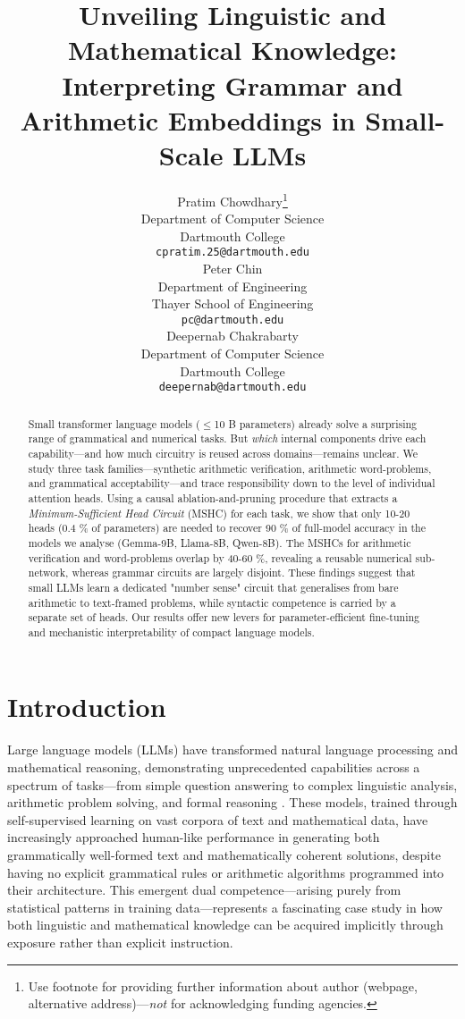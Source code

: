 \documentclass{article}
\title{Unveiling Linguistic and Mathematical Knowledge: Interpreting Grammar and Arithmetic Embeddings in Small-Scale LLMs}
\author{%
  Pratim Chowdhary\thanks{Use footnote for providing further information
    about author (webpage, alternative address)---\emph{not} for acknowledging
    funding agencies.} \\
  Department of Computer Science\\
  Dartmouth College\\
  \texttt{cpratim.25@dartmouth.edu} \\
  \And
  Peter Chin \\
  Department of Engineering\\
  Thayer School of Engineering\\
  \texttt{pc@dartmouth.edu} \\
  \And
  Deepernab Chakrabarty \\
  Department of Computer Science\\
  Dartmouth College\\
  \texttt{deepernab@dartmouth.edu} \\
}
\begin{document}
\maketitle

\begin{abstract}
Small transformer language models ($\leq$10 B parameters) already solve a surprising range of grammatical and numerical tasks. But \emph{which} internal components drive each capability—and how much circuitry is reused across domains—remains unclear. We study three task families—synthetic arithmetic verification, arithmetic word-problems, and grammatical acceptability—and trace responsibility down to the level of individual attention heads. Using a causal ablation-and-pruning procedure that extracts a \emph{Minimum-Sufficient Head Circuit} (MSHC) for each task, we show that only 10-20 heads (0.4 \% of parameters) are needed to recover 90 \% of full-model accuracy in the models we analyse (Gemma-9B, Llama-8B, Qwen-8B). The MSHCs for arithmetic verification and word-problems overlap by 40-60 \%, revealing a reusable numerical sub-network, whereas grammar circuits are largely disjoint. These findings suggest that small LLMs learn a dedicated "number sense" circuit that generalises from bare arithmetic to text-framed problems, while syntactic competence is carried by a separate set of heads. Our results offer new levers for parameter-efficient fine-tuning and mechanistic interpretability of compact language models.
\end{abstract}

\section{Introduction}

Large language models (LLMs) have transformed natural language processing and mathematical reasoning, demonstrating unprecedented capabilities across a spectrum of tasks—from simple question answering to complex linguistic analysis, arithmetic problem solving, and formal reasoning \citep{brown2020language, chowdhery2022palm, touvron2023llama2, jiang2023mistral}. These models, trained through self-supervised learning on vast corpora of text and mathematical data, have increasingly approached human-like performance in generating both grammatically well-formed text and mathematically coherent solutions, despite having no explicit grammatical rules or arithmetic algorithms programmed into their architecture. This emergent dual competence—arising purely from statistical patterns in training data—represents a fascinating case study in how both linguistic and mathematical knowledge can be acquired implicitly through exposure rather than explicit instruction.
\end{document}
